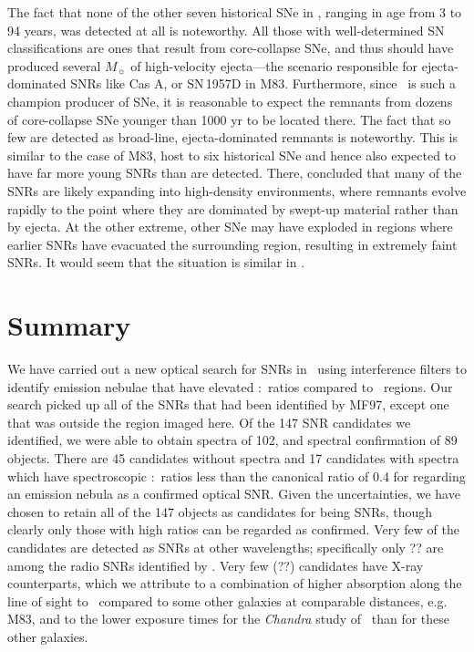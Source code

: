The fact that none of the other seven historical SNe in \gal, ranging in age from 3 to 94 years, was detected at all is noteworthy.  All those with well-determined SN classifications are ones that result from core-collapse SNe, and thus should have produced several $M_{\sun}$ of high-velocity ejecta---the scenario responsible for ejecta-dominated SNRs like Cas A, or SN\,1957D in M83.  Furthermore, since \gal\ is such a champion producer of SNe, it is reasonable to expect the remnants from dozens of core-collapse SNe younger than 1000 yr to be located there.  The fact that so few are detected as broad-line, ejecta-dominated remnants is noteworthy.   This is similar to the case of M83, host to six historical SNe and hence also expected to have far more young SNRs than are detected.  There, \citet{winkler17} concluded that many of the SNRs are likely expanding into high-density environments, where remnants evolve rapidly to the point where they are dominated by swept-up material rather than by ejecta. At the other extreme, other SNe may have exploded in regions where earlier SNRs have evacuated the surrounding region, resulting in extremely faint SNRs.  It would seem that the situation is similar in \gal.



\section{Summary \label{sec:summary}}

We have carried out a new optical search for SNRs in \gal\ using interference filters to identify emission nebulae that have elevated \sii:\ha\ ratios compared to \hii\ regions.  Our search picked up all of the SNRs that had been identified by MF97, except one that was outside the region imaged here. Of the 147 SNR candidates we identified, we were able to obtain spectra of 102, and spectral confirmation of 89 objects.  There are 45 candidates  without spectra and 17 candidates with spectra which have spectroscopic \sii:\ha\ ratios less than the canonical ratio of 0.4 for regarding an emission nebula as a confirmed optical SNR.  Given the uncertainties, we have chosen to retain all of the 147 objects as candidates for being SNRs, though clearly only those with high ratios can be regarded as confirmed.  Very few of the candidates are detected as SNRs at other wavelengths; specifically only ?? are among the radio SNRs identified by \cite{lacey01}.  Very few (??) candidates have X-ray counterparts, which we attribute to a combination of higher absorption along the line of sight to \gal\ compared to some other galaxies at comparable distances, e.g. M83, and to the %
lower exposure times for the {\em Chandra} study of \gal\ than for these other galaxies. 


